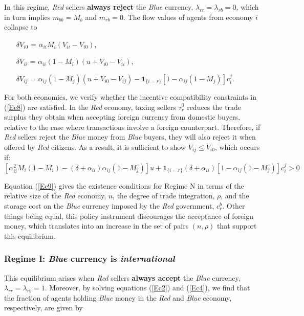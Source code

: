 In this regime, \textit{Red} sellers \textbf{always reject} the \textit{Blue} currency, $\lambda_{rr}=\lambda_{rb}=0$, which in turn implies $m_{bb}=M_b$ and $m_{rb}=0$. The flow values of agents from economy $i$ collapse to

\begin{itemize}
    \item[$\delta V_{i0}$] = $\alpha_{ii}M_{i}(V_{ii}-V_{i0})$,
    \item[$\delta V_{ii}$] = $\alpha_{ii}(1-M_{i})(u+V_{i0}-V_{ii})$,
    \item[$\delta V_{ij}$] = $\alpha_{ij}(1-M_{j})(u+V_{i0}-V_{ij}) - \textbf{1}_{\{i=r\}}\left[1-\alpha_{ij}(1-M_{j})\right]c^j_i$.
\end{itemize}

For both economies, we verify whether the incentive compatibility constraints in (\ref{Ec8}) are satisfied. In the \textit{Red} economy, taxing sellers $\tau_r^0$ reduces the trade surplus they obtain when accepting foreign currency from domestic buyers, relative to the case where transactions involve a foreign counterpart. Therefore, if \textit{Red} sellers reject the \textit{Blue} money from \textit{Blue} buyers, they will also reject it when offered by \textit{Red} citizens. As a result, it is sufficient to show $V_{ij} \leq V_{i0}$, which occurs if: 
\begin{equation}
    \left[\alpha_{ii}^{2} M_{i}(1-M_{i})- (\delta + \alpha_{ii})\alpha_{ij}(1-M_{j})\right]u + \textbf{1}_{\{i=r\}}(\delta + \alpha_{ii})\left[1-\alpha_{ij}(1-M_{j})\right]c_{i}^{j}>0
    \tag{9} \label{Ec9}
\end{equation}

Equation (\ref{Ec9}) gives the existence conditions for Regime N in terms of the relative size of the \textit{Red} economy, $n$, the degree of trade integration, $\rho$, and the storage cost on the \textit{Blue} currency imposed by the \textit{Red} government, $c_r^b$. Other things being equal, this policy instrument discourages the acceptance of foreign money, which translates into an increase in the set of pairs $(n,\rho)$ that support this equilibrium.

\subsubsection{Regime I: \textit{Blue} currency is \textit{international}}

This equilibrium arises when \textit{Red} sellers \textbf{always accept} the \textit{Blue} currency, $\lambda_{rr}=\lambda_{rb}=1$. Moreover, by solving equations (\ref{Ec2}) and (\ref{Ec4}), we find that the fraction of agents holding \textit{Blue} money in the \textit{Red} and \textit{Blue} economy, respectively, are given by

